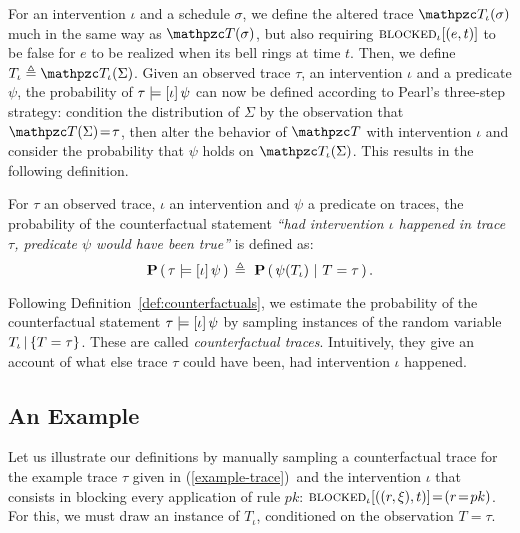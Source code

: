 
For an intervention $\iota$ and a schedule $\sigma$, we define the
altered trace $\DetTrace_\iota(\sigma)$ much in the same way as
$\DetTrace(\sigma)$, but also requiring ${\textsc{blocked}}_{\iota}[(e, t)]$ to
be false for $e$ to be realized when its bell rings at time $t$.
Then, we define $T_\iota \eqdef \DetTrace_\iota(\Sigma)$.  Given an
observed trace $\tau$, an intervention $\iota$ and a predicate $\psi$,
the probability of $\tau \models [\iota] \, \psi{}$ can now be defined according to Pearl's
three-step strategy: \ItAbduction{} condition the distribution of
$\Sigma$ by the observation that $\DetTrace(\Sigma)\!=\!\tau$, then
\ItAction{} alter the behavior of $\DetTrace$ with intervention
$\iota$ and \ItPrediction{} consider the probability that $\psi$ holds
on $\DetTrace_\iota(\Sigma)$. This results in the following
definition.

\begin{definition}
  \label{def:counterfactuals}
  For $\tau$ an observed trace, $\iota$ an intervention and $\psi$ a
  predicate on traces, the probability of the counterfactual statement
  \textit{``had intervention $\iota$ happened in trace $\tau$,
    predicate $\psi$ would have been true''} is defined as:
  \[ \mathbf{P} \left(\, \tau \models [\iota] \, \psi{} \,\right){} \triangleq \ \mathbf{P} \left(\, \psi({T_\iota}{}) \,\, | \,\, T =
      \tau \,\right). \]
\end{definition}

Following Definition~\ref{def:counterfactuals}, we estimate the
probability of the counterfactual statement $\tau \models [\iota] \, \psi{}$ by sampling
instances of the random variable ${T_\iota\,|\,\{T=\tau\}}{}$. 
These are called \emph{counterfactual traces}. Intuitively,
they give an account of what else trace $\tau$ could have been, had
intervention $\iota$ happened.


\subsection{An Example}\label{subsec:counterfactuals-example}


\newcommand{\RTrace}{T} \newcommand{\ATrace}{T_\iota} Let us
illustrate our definitions by manually sampling a counterfactual trace
for the example trace $\tau$ given in (\ref{example-trace})\, and the
intervention $\iota$ that consists in blocking every application of
rule $pk$:
${\textsc{blocked}}_{\iota}[((r, \xi), t)] \!=\! (r \!=\! pk)$.
For this, we must draw an instance of $\ATrace$, conditioned on the
observation $\RTrace \!=\! \tau$.

